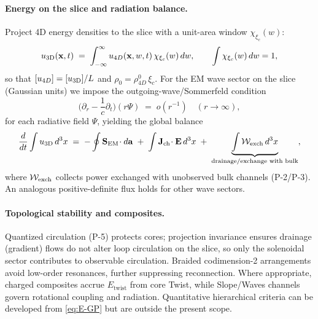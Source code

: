 \paragraph{Energy on the slice and radiation balance.}
Project 4D energy densities to the slice with a unit-area window $\chi_{\xi_c}(w)$:
\begin{equation}
u_{\rm 3D}(\mathbf x,t) \;=\; \int_{-\infty}^{\infty} u_{4D}(\mathbf x,w,t)\,\chi_{\xi_c}(w)\,dw,
\qquad \int \chi_{\xi_c}(w)\,dw=1,
\end{equation}
so that $[u_{4D}]=[u_{\rm 3D}]/L$ and $\rho_0=\rho_{4D}^0\,\xi_c$. For the EM wave sector on the slice (Gaussian units) we impose the outgoing-wave/Sommerfeld condition
\[
\Big(\partial_r-\frac{1}{c}\partial_t\Big)\!(r\Psi)\;=\;o(r^{-1})\quad (r\to\infty),
\]
for each radiative field $\Psi$, yielding the global balance
\begin{equation}
\frac{d}{dt}\int u_{\rm 3D}\,d^3x
\;=\; -\oint \mathbf S_{\rm EM}\!\cdot d\mathbf a
\;+\;\int \mathbf J_{\rm ch}\!\cdot\mathbf E\,d^3x
\;+\;\underbrace{\int \mathcal W_{\rm exch}\,d^3x}_{\text{drainage/exchange with bulk}},
\end{equation}
where $\mathcal W_{\rm exch}$ collects power exchanged with unobserved bulk channels (P-2/P-3). An analogous positive-definite flux holds for other wave sectors.

\paragraph{Topological stability and composites.}
Quantized circulation (P-5) protects cores; projection invariance ensures drainage (gradient) flows do not alter loop circulation on the slice, so only the solenoidal sector contributes to observable circulation. Braided codimension-2 arrangements avoid low-order resonances, further suppressing reconnection. Where appropriate, charged composites accrue $E_{\text{twist}}$ from core Twist, while Slope/Waves channels govern rotational coupling and radiation. Quantitative hierarchical criteria can be developed from \eqref{eq:E-GP} but are outside the present scope.

\medskip
\noindent
{}
\medskip

